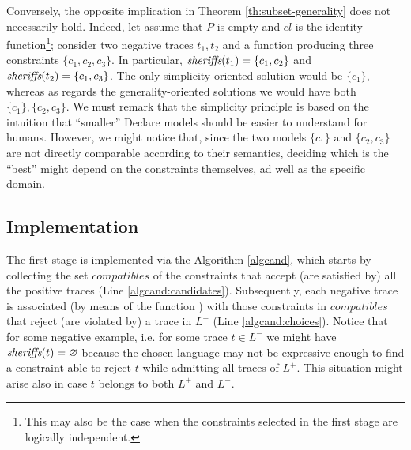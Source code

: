 Conversely, the opposite implication in Theorem \ref{th:subset-generality} does not necessarily hold. Indeed, let assume that $P$ is empty and $cl$ is the identity function\footnote{This may also be the case when the constraints selected in the first stage are logically independent.}; consider two negative traces $t_1, t_2$ and a \textit{\sheriff} function producing three constraints $\{c_1, c_2,c_3\}$. In particular, $\textit{sheriffs}(t_1)=\{c_1, c_2\}$ and $\textit{sheriffs}(t_2)=\{c_1, c_3\}$. The only simplicity-oriented solution would be  $\{c_1\}$, whereas as regards the generality-oriented solutions we would have both $\{c_1\}, \{c_2, c_3\}$. We must remark that the simplicity principle is based on the intuition that ``smaller'' Declare models should be easier to understand for humans. However, we might notice that, since the two models $\{c_1\}$ and $\{c_2, c_3\}$ are not directly comparable according to their semantics, deciding which is the ``best'' might depend on the constraints themselves, ad well as the specific domain.





\subsection{Implementation}
\label{subsec:impl}

The first stage is implemented via the Algorithm \ref{algcand}, which starts by collecting the set $compatibles$ of the constraints that accept (are satisfied by) all the positive traces (Line \ref{algcand:candidates}). Subsequently, each negative trace is associated (by means of the function \textit{\sheriff}) with those constraints in $compatibles$ that reject (are violated by) a trace in $L^-$ (Line \ref{algcand:choices}). Notice that for some negative example, i.e. for some trace $t\in L^-$ we might have $\textit{sheriffs}(t)=\varnothing$ because the chosen language may not be expressive enough to find a constraint able to reject $t$ while admitting all traces of $L^+$. This situation might arise also in case $t$ belongs to both $L^+$ and $L^-$.
%

